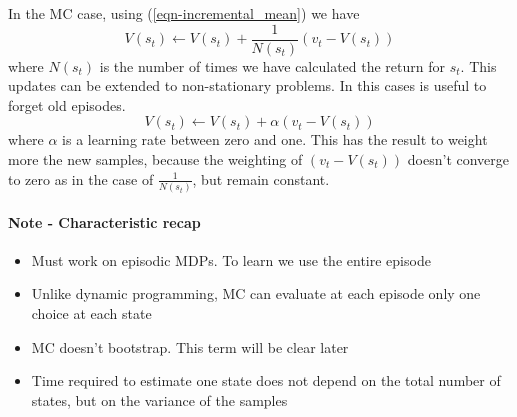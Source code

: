 \documentclass[../main.tex]{subfiles}
\begin{document}
In the MC case, using (\ref{eqn-incremental_mean}) we have
\begin{equation}
    V(s_t) \leftarrow V(s_t) + \frac{1}{N(s_t)}(v_t-V(s_t))
\end{equation}
where $N(s_t)$ is the number of times we have calculated the return for $s_t$.
This updates can be extended to non-stationary problems. In this cases is useful to forget old episodes.
\begin{equation}
    V(s_t) \leftarrow V(s_t) + \alpha(v_t-V(s_t))
\end{equation}
where $\alpha$ is a learning rate between zero and one. This has the result to weight more the new samples, because the weighting of $(v_t-V(s_t))$ doesn't converge to zero as in the case of $\frac{1}{N(s_t)}$, but remain constant.
\paragraph{Note - Characteristic recap}
\begin{itemize}
    \item Must work on episodic MDPs. To learn we use the entire episode
    \item Unlike dynamic programming, MC can evaluate at each episode only one choice at each state
    \item MC doesn't bootstrap. This term will be clear later
    \item Time required to estimate one state does not depend on the total number of states, but on the variance of the samples
\end{itemize}
\newpage
\end{document}
